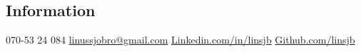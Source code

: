 \begin{aside}
    \section{Information}
      070-53 24 084
      \href{mailto:linussjobro@gmail.com}{linussjobro@gmail.com}
      \href{https://www.linkedin.com/in/linsjb}{Linkedin.com/in/linsjb}
      \href{https://github.com/linsjb}{Github.com/linsjb}
  \end{aside}
